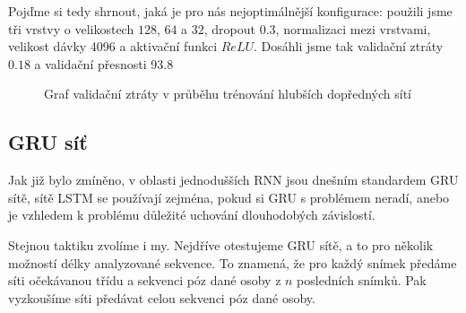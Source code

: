 Pojďme si tedy shrnout, jaká je pro nás nejoptimálnější konfigurace: použili
jsme tři vrstvy o velikostech $128$, $64$ a $32$, dropout $0.3$, normalizaci
mezi vrstvami, velikost dávky 4096 a aktivační funkci $ReLU$. Dosáhli jsme tak
validační ztráty $0.18$ a validační přesnosti 93.8%

\begin{figure}[]
    \centering
    \caption{Graf validační ztráty v průběhu trénování hlubších dopředných sítí }
    \label{graph:deepffnn}
\end{figure}

\subsection{GRU síť}

Jak již bylo zmíněno, v oblasti jednodušších RNN jsou dnešním standardem GRU
sítě, sítě LSTM se používají zejména, pokud si GRU s problémem neradí, anebo je
vzhledem k problému důležité uchování dlouhodobých závislostí.

Stejnou taktiku zvolíme i my. Nejdříve otestujeme GRU sítě, a to pro několik
možností délky analyzované sekvence. To znamená, že pro každý snímek předáme
síti očekávanou třídu a sekvenci póz dané osoby z $n$ posledních snímků. Pak
vyzkoušíme síti předávat celou sekvenci póz dané osoby.

